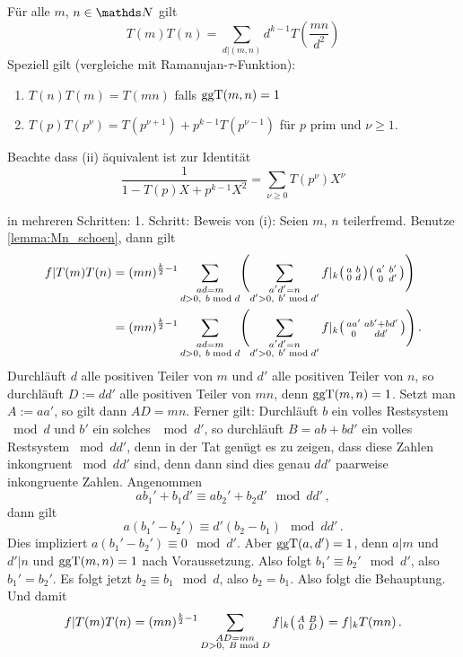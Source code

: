 \begin{satz}\label{TmTn}
	Für alle $m$, $n \in \NN$ gilt
	\[
	T(m) T(n) = \sum_{d | (m,n)} d^{k-1} T \left( \frac {mn}{d^2} \right)
	\]
	Speziell gilt (vergleiche mit Ramanujan-$\tau$-Funktion):
	\begin{enumerate}
		\item $T(n)T(m) = T(mn)$ falls $\operatorname{ggT}(m,n) = 1$
		\item $T(p) T(p^\nu) = T(p^{\nu+1}) + p^{k-1} T(p^{\nu-1})$ für $p$ prim und $\nu \geq 1$.
	\end{enumerate}
	
	Beachte dass (ii) äquivalent ist zur Identität
	\[
	\frac{1}{1-T(p)X+p^{k-1}X^2} = \sum_{\nu \geq 0} T(p^\nu) X^\nu
	\]
\end{satz}

\begin{bewe}
	in mehreren Schritten:
	1. Schritt: Beweis von (i):
	Seien $m$, $n$ teilerfremd.
	Benutze \autoref{lemma:Mn_schoen}, dann gilt
	\begin{align*}
	f|T(m)T(n)
	&= (mn)^{\frac{k}{2}-1} \sum_{\substack{ad=m \vphantom{d'} \\ d>0,\ \vphantom{b'}b\bmod d}} \Biggl(\sum_{\substack{a'd' = n\\ d'>0,\ b' \bmod d'}} f|_k \mymat ab0d \mymat{a'}{b'}{0}{d'} \Biggr) \\
	&= (mn)^{\frac{k}{2}-1} \sum_{\substack{ad=m \vphantom{d'} \\ d>0,\ \vphantom{b'}b\bmod d}} \Biggl(\sum_{\substack{a'd' = n\\ d'>0,\ b' \bmod d'}} f|_k \mymat{aa'}{ab'+bd'}{0}{dd'} \Biggr)
	\,.
	\end{align*}
	Durchläuft $d$ alle positiven Teiler von $m$ und $d'$ alle positiven Teiler von $n$, so durchläuft $D := dd'$ alle positiven Teiler von $mn$, denn $\operatorname{ggT}(m, n) = 1$.
	Setzt man $A := aa'$, so gilt dann $AD = mn$.
	Ferner gilt: Durchläuft $b$ ein volles Restsystem $\bmod d$ und $b'$ ein solches $\mod d'$, so durchläuft $B = ab+bd'$ ein volles Restsystem $\bmod dd'$, denn in der Tat genügt es zu zeigen, dass diese Zahlen inkongruent $\bmod dd'$ sind, denn dann sind dies genau $dd'$ paarweise inkongruente Zahlen.
	Angenommen
	\[
	ab_1' + b_1d' \equiv ab_2' +b_2d' \mod dd'
	\,,
	\]
	dann gilt
	\[
	a(b_1' - b_2') \equiv d'(b_2 - b_1) \mod dd'
	\,.
	\]
	Dies impliziert $a(b_1'- b_2') \equiv 0 \mod d'$. Aber $\operatorname{ggT}(a, d') = 1$, denn $a|m$ und $d'|n$ und $\operatorname{ggT}(m, n) = 1$ nach Voraussetzung.
	Also folgt $b_1' \equiv b_2' \mod d'$, also $b_1' = b_2'$.
	Es folgt jetzt $b_2 \equiv b_1 \mod d$, also $b_2 = b_1$.
	Also folgt die Behauptung.
	Und damit
	\[
	f|T(m)T(n)
	= (mn)^{\frac{k}{2}-1} \sum_{\substack{AD = mn\\ D > 0,\ B \bmod D}} f|_k \mymat AB0D
	= f|_kT(mn)
	\,.
	\]
	

\end{bewe}
